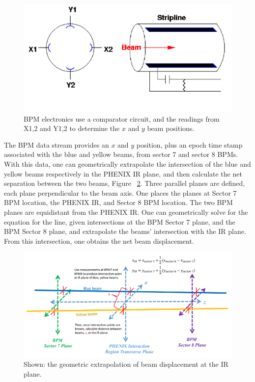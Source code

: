 \begin{figure}[ht]
  \begin{center}
    \includegraphics[width=1.0\linewidth]{./figures/bpm_schematic}
    \caption{ 
      BPM electronics use a comparator circuit, and the readings from X{1,2} and
      Y{1,2} to determine the $x$ and $y$ beam positions. 
    }
    \label{fig:bpm_schematic_cartoon}
  \end{center}
\end{figure}

The BPM data stream provides an $x$ and $y$ position, plus an epoch time stamp
associated with the blue and yellow beams, from sector 7 and sector 8 BPMs.
With this data, one can geometrically extrapolate the intersection of the blue
and yellow beams respectively in the PHENIX IR plane, and then calculate the net
separation between the two beams, Figure ~\ref{fig:bpm_ir_xing_cartoon}.  Three
parallel planes are defined, each plane perpendicular to the beam axis.  One
places the planes at Sector 7 BPM location, the PHENIX IR, and Sector 8 BPM
location.  The two BPM planes are equidistant from the PHENIX IR. One can
geometrically solve for the equation for the line, given intersections at the
BPM Sector 7 plane, and the BPM Sector 8 plane, and extrapolate the beams'
intersection with the IR plane. From this intersection, one obtains the net beam
displacement.

\begin{figure}[ht]
\begin{center}
\includegraphics[width=1.0\linewidth]{./figures/bpm_ir_beam_separation}
\caption{
  Shown: the geometric extrapolation of beam displacement at the IR plane.
}
\label{fig:bpm_ir_xing_cartoon}
\end{center}
\end{figure}



